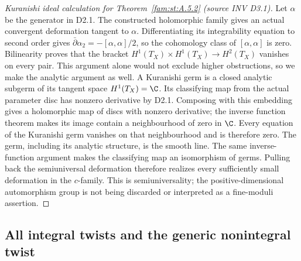 \begin{proof}[Kuranishi ideal calculation for Theorem~\ref{fam:st:A.5.2} (source INV D3.1)]
Let $\alpha$ be the generator in D2.1. The constructed holomorphic
family gives an actual convergent deformation tangent to $\alpha$.
Differentiating its integrability equation to second order gives
$\bar\partial\alpha_2=-[\alpha,\alpha]/2$, so the cohomology class
of $[\alpha,\alpha]$ is zero. Bilinearity proves that the bracket
$H^1(T_X)\times H^1(T_X)\to H^2(T_X)$ vanishes on every pair.
This argument alone would not exclude higher obstructions, so we
make the analytic argument as well. A Kuranishi germ is a closed
analytic subgerm of its tangent space $H^1(T_X)=\C$. Its classifying
map from the actual parameter disc has nonzero derivative by D2.1.
Composing with this embedding gives a holomorphic map of discs with
nonzero derivative; the inverse function theorem makes its image
contain a neighbourhood of zero in $\C$. Every equation of the
Kuranishi germ vanishes on that neighbourhood and is therefore zero.
The germ, including its analytic structure, is the smooth line.
The same inverse-function argument makes the classifying map an
isomorphism of germs. Pulling back the semiuniversal deformation
therefore realizes every sufficiently small deformation in the
$c$-family. This is semiuniversality; the positive-dimensional
automorphism group is not being discarded or interpreted as a
fine-moduli assertion.
\end{proof}

\subsection{All integral twists and the generic nonintegral twist}

